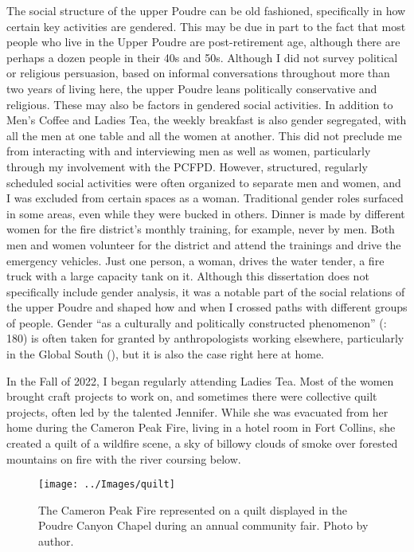 \documentclass[
]{article}
\begin{document}
The social structure of the upper Poudre can be old fashioned, specifically in how certain key activities are gendered. This may be due in part to the fact that most people who live in the Upper Poudre are post-retirement age, although there are perhaps a dozen people in their 40s and 50s. Although I did not survey political or religious persuasion, based on informal conversations throughout more than two years of living here, the upper Poudre leans politically conservative and religious. These may also be factors in gendered social activities. In addition to Men's Coffee and Ladies Tea, the weekly breakfast is also gender segregated, with all the men at one table and all the women at another. This did not preclude me from interacting with and interviewing men as well as women, particularly through my involvement with the PCFPD. However, structured, regularly scheduled social activities were often organized to separate men and women, and I was excluded from certain spaces as a woman. Traditional gender roles surfaced in some areas, even while they were bucked in others. Dinner is made by different women for the fire district's monthly training, for example, never by men. Both men and women volunteer for the district and attend the trainings and drive the emergency vehicles. Just one person, a woman, drives the water tender, a fire truck with a large capacity tank on it. Although this dissertation does not specifically include gender analysis, it was a notable part of the social relations of the upper Poudre and shaped how and when I crossed paths with different groups of people. Gender ``as a culturally and politically constructed phenomenon'' (: 180) is often taken for granted by anthropologists working elsewhere, particularly in the Global South (), but it is also the case right here at home.

In the Fall of 2022, I began regularly attending Ladies Tea. Most of the women brought craft projects to work on, and sometimes there were collective quilt projects, often led by the talented Jennifer. While she was evacuated from her home during the Cameron Peak Fire, living in a hotel room in Fort Collins, she created a quilt of a wildfire scene, a sky of billowy clouds of smoke over forested mountains on fire with the river coursing below.

\begin{figure}
\texttt{[image: ../Images/quilt]} \caption[Cameron Peak Fire quilt]{The Cameron Peak Fire represented on a quilt displayed in the Poudre Canyon Chapel during an annual community fair. Photo by author.}\label{fig:figureTitle8}
\end{figure}
\end{document}
